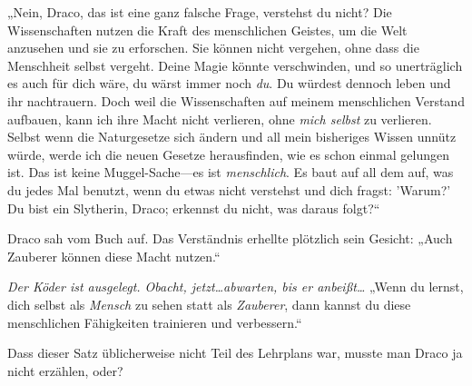 „Nein, Draco, das ist eine ganz falsche Frage, verstehst du nicht? Die Wissenschaften nutzen die Kraft des menschlichen Geistes, um die Welt anzusehen und sie zu erforschen. Sie können nicht vergehen, ohne dass die Menschheit selbst vergeht. Deine Magie könnte verschwinden, und so unerträglich es auch für dich wäre, du wärst immer noch \emph{du}. Du würdest dennoch leben und ihr nachtrauern. Doch weil die Wissenschaften auf meinem menschlichen Verstand aufbauen, kann ich ihre Macht nicht verlieren, ohne \emph{mich selbst} zu verlieren. Selbst wenn die Naturgesetze sich ändern und all mein bisheriges Wissen unnütz würde, werde ich die neuen Gesetze herausfinden, wie es schon einmal gelungen ist. Das ist keine Muggel-Sache—es ist \emph{menschlich}. Es baut auf all dem auf, was du jedes Mal benutzt, wenn du etwas nicht verstehst und dich fragst: 'Warum?' Du bist ein Slytherin, Draco; erkennst du nicht, was daraus folgt?“

Draco sah vom Buch auf. Das Verständnis erhellte plötzlich sein Gesicht: „Auch Zauberer können diese Macht nutzen.“

\emph{Der Köder ist ausgelegt. Obacht, jetzt…abwarten, bis er anbeißt…} „Wenn du lernst, dich selbst als \emph{Mensch} zu sehen statt als \emph{Zauberer}, dann kannst du diese menschlichen Fähigkeiten trainieren und verbessern.“

Dass dieser Satz üblicherweise nicht Teil des Lehrplans war, musste man Draco ja nicht erzählen, oder?

